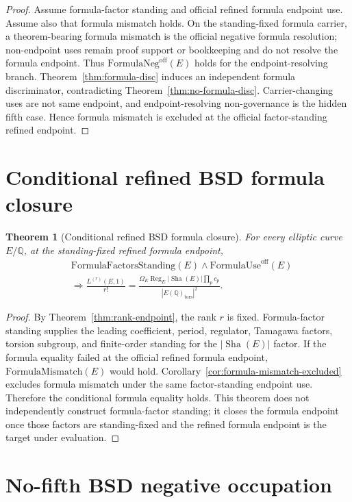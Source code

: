 \documentclass[11pt]{article}
\newtheorem{theorem}{Theorem}[section]
\newcommand{\Q}{\mathbb{Q}}
\newcommand{\Sha}{\operatorname{Sha}}
\newcommand{\Reg}{\operatorname{Reg}}
\newcommand{\tors}{\operatorname{tors}}
\newcommand{\FormulaMismatch}{\mathrm{FormulaMismatch}}
\newcommand{\FormulaUse}{\mathrm{FormulaUse}^{\mathrm{off}}}
\newcommand{\FormulaNeg}{\mathrm{FormulaNeg}^{\mathrm{off}}}
\begin{document}
\begin{proof}
Assume formula-factor standing and official refined formula endpoint use. Assume also that formula mismatch holds. On the standing-fixed formula carrier, a theorem-bearing formula mismatch is the official negative formula resolution; non-endpoint uses remain proof support or bookkeeping and do not resolve the formula endpoint. Thus $\FormulaNeg(E)$ holds for the endpoint-resolving branch. Theorem~\ref{thm:formula-disc} induces an independent formula discriminator, contradicting Theorem~\ref{thm:no-formula-disc}. Carrier-changing uses are not same endpoint, and endpoint-resolving non-governance is the hidden fifth case. Hence formula mismatch is excluded at the official factor-standing refined endpoint.
\end{proof}

\section{Conditional refined BSD formula closure}

\begin{theorem}[Conditional refined BSD formula closure]\label{thm:refined-endpoint}
For every elliptic curve $E/\Q$, at the standing-fixed refined formula endpoint,
\[
\begin{aligned}
&\mathrm{FormulaFactorsStanding}(E)\wedge \FormulaUse(E)\\
&\Rightarrow
\frac{L^{(r)}(E,1)}{r!}
=
\frac{\Omega_E\Reg_E |\Sha(E)|\prod_p c_p}
{|E(\Q)_{\tors}|^2}.
\end{aligned}
\]
\end{theorem}

\begin{proof}
By Theorem~\ref{thm:rank-endpoint}, the rank $r$ is fixed. Formula-factor standing supplies the leading coefficient, period, regulator, Tamagawa factors, torsion subgroup, and finite-order standing for the $|\Sha(E)|$ factor. If the formula equality failed at the official refined formula endpoint, $\FormulaMismatch(E)$ would hold. Corollary~\ref{cor:formula-mismatch-excluded} excludes formula mismatch under the same factor-standing endpoint use. Therefore the conditional formula equality holds. This theorem does not independently construct formula-factor standing; it closes the formula endpoint once those factors are standing-fixed and the refined formula endpoint is the target under evaluation.
\end{proof}

\section{No-fifth BSD negative occupation}
\end{document}
